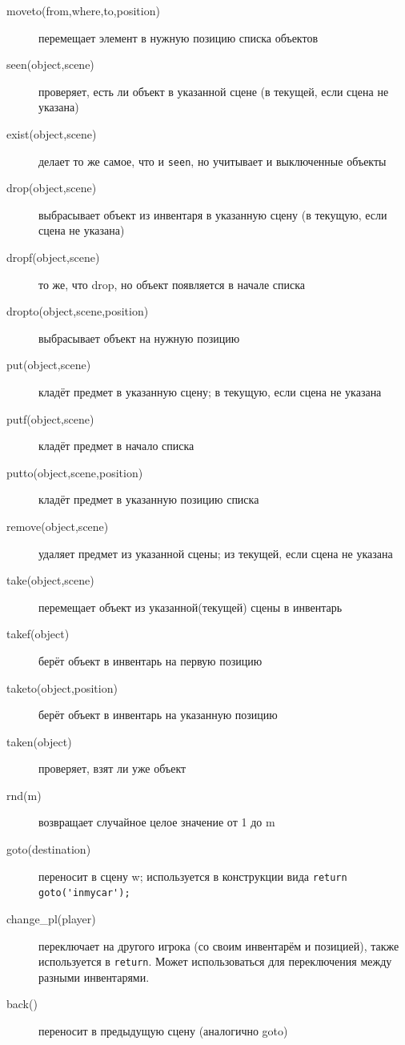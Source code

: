 \documentclass[a4paper,12pt]{article}
\begin{document}
\begin{description}
\item[moveto(from,where,to,position)]  перемещает элемент в нужную позицию списка объектов
\item[seen(object,scene)]  проверяет, есть ли объект в указанной сцене (в текущей, если сцена не указана)
\item[exist(object,scene)]  делает то же самое, что и \verb/seen/, но учитывает и выключенные объекты
\item[drop(object,scene)]  выбрасывает объект из инвентаря в указанную сцену (в текущую, если сцена не указана)
\item[dropf(object,scene)]  то же, что drop, но объект появляется в начале списка
\item[dropto(object,scene,position)]  выбрасывает объект на нужную позицию
\item[put(object,scene)]  кладёт предмет в указанную сцену; в текущую, если сцена не указана
\item[putf(object,scene)]  кладёт предмет в начало списка
\item[putto(object,scene,position)]  кладёт предмет в указанную позицию списка
\item[remove(object,scene)]  удаляет предмет из указанной сцены; из текущей, если сцена не указана
\item[take(object,scene)]  перемещает объект из указанной(текущей) сцены в инвентарь
\item[takef(object)]  берёт объект в инвентарь на первую позицию
\item[taketo(object,position)]  берёт объект в инвентарь на указанную позицию
\item[taken(object)]  проверяет, взят ли уже объект
\item[rnd(m)]  возвращает случайное целое значение от 1 до m
\item[goto(destination)]  переносит в сцену w; используется в конструкции вида \verb/return goto('inmycar');/
\item[change\_pl(player)]  переключает на другого игрока (со своим инвентарём и позицией), также используется в \verb/return/. Может использоваться для переключения между разными инвентарями.
\item[back()]  переносит в предыдущую сцену (аналогично goto)

\end{description}
\end{document}
